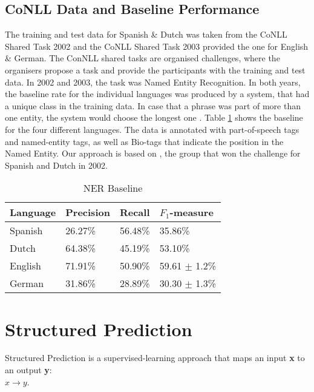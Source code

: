 \documentclass[11pt]{article}
\begin{document}
\subsection{CoNLL Data and Baseline Performance}
The training and test data for Spanish \& Dutch was taken from the CoNLL Shared Task 2002 \cite{tksintro} and 
the CoNLL Shared Task 2003 \cite{TjongKimSang:2003:ICS:1119176.1119195} provided the one for English \& German.
The ConNLL shared tasks are organised challenges, where the organisers propose a task and provide the participants with the
training and test data. 
In 2002 and 2003, the task was Named Entity Recognition. 
In both years, the baseline rate for the individual languages was produced by a system, that had a unique class in the training data. 
In case that a phrase was part of more than one entity, the system would choose the longest one \cite{TjongKimSang:2003:ICS:1119176.1119195}. 
Table \ref{table:Base} shows the baseline for the four different languages.  
The data is annotated with part-of-speech tags and named-entity tags, as well as Bio-tags that indicate the position in the Named Entity. %
Our approach is based on \cite{strlearn}, the group that won the challenge for Spanish and Dutch in 2002. 


\begin{table}[h!]
\scriptsize
\begin{tabular}{|l|l|l|l|}
\hline
\bf Language & \bf Precision & \bf Recall & \bf $F_1$-measure \\ \hline
Spanish &             26.27\% & 56.48\% & 35.86\%        \\
Dutch  &             64.38\%  &45.19\%    & 53.10\%  \\
English &              71.91\%& 50.90\%  & 59.61 $\pm$ 1.2\%\\
German &      31.86\%  & 28.89\% & 30.30  $\pm$ 1.3\% \\
\hline
\end{tabular}
\caption{NER Baseline}
\label{table:Base}
\end{table}

\section{Structured Prediction}
Structured Prediction \cite{strlearn} is a supervised-learning approach that maps an input \textbf{x} to an output \textbf{y}: \\

$ x \rightarrow y $. \\
\end{document}
